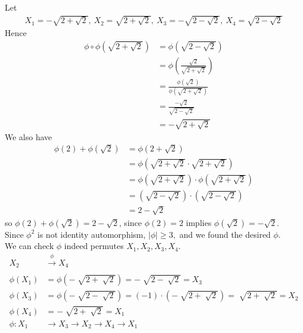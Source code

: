 \documentclass{article}
\begin{document}
\begin{homeworkProblem}
    Let 
    \begin{align}
    X_1 = - \sqrt{2 + \sqrt{2}}, \ X_2 = \sqrt{2 + \sqrt{2}}, \ X_3 = - \sqrt{2 - \sqrt{2}}, \ X_4 = \sqrt{2 - \sqrt{2}}
    \end{align}
    Hence 
    \begin{align}
        \phi \circ \phi \left( \sqrt{2 + \sqrt{2}}\right) &= \phi \left( \sqrt{2 - \sqrt{2}}\right) \\ 
        &= \phi \left( \frac{ \sqrt{2} }{ \sqrt{2+\sqrt{2}} }\right)\\
        &= \frac{ \phi (\sqrt{2}) }{ \phi \left( \sqrt{2 + \sqrt{2}}\right) }\\
        &= \frac{ - \sqrt{2} }{ \sqrt{2-\sqrt{2}} }\\
        &= - \sqrt{2 + \sqrt{2}}
    \end{align}
    We also have
    \begin{align}
        \phi(2) + \phi(\sqrt{2}) &= \phi(2 + \sqrt{2})\\
        &= \phi \left( \sqrt{2 + \sqrt{2}} \cdot \sqrt{2 + \sqrt{2}} \right)\\
        &= \phi \left( \sqrt{2 + \sqrt{2}} \right) \cdot \phi \left( \sqrt{2 + \sqrt{2}} \right)\\
        &= \left( \sqrt{2 - \sqrt{2}} \right) \cdot \left( \sqrt{2 - \sqrt{2}} \right)\\
        &= 2 - \sqrt{2}
    \end{align}
    so $\phi(2) + \phi(\sqrt{2}) = 2 - \sqrt{2}$,
    since $\phi(2) = 2$ implies $\phi(\sqrt{2}) = - \sqrt{2}$.\\
    Since $\phi^2$ is not identity automorphism, $\lvert \phi \rvert \geq 3,$ 
    and we found the desired $\phi$.\\
    We can check $\phi$ indeed permutes $X_1, X_2, X_3, X_4$.\\
    \begin{align}
        X_2 &\xrightarrow[]{\phi}    X_4\\
        \phi(X_1) &= \phi(-\sqrt[]{2+\sqrt[]{2}}) = - \sqrt[]{2-\sqrt[]{2}} = X_3\\
        \phi(X_3) &= \phi(- \sqrt[]{2-\sqrt[]{2}}) = (-1)\cdot (-\sqrt[]{2+\sqrt[]{2}}) = \sqrt[]{2+\sqrt[]{2}} = X_2\\
        \phi(X_4) &= - \sqrt[]{2+\sqrt[]{2}} = X_1\\
        \phi: X_1 &\xrightarrow[]{} X_3 \xrightarrow[]{} X_2 \xrightarrow[]{} X_4 \xrightarrow[]{} X_1
    \end{align}


\end{homeworkProblem}
\end{document}

